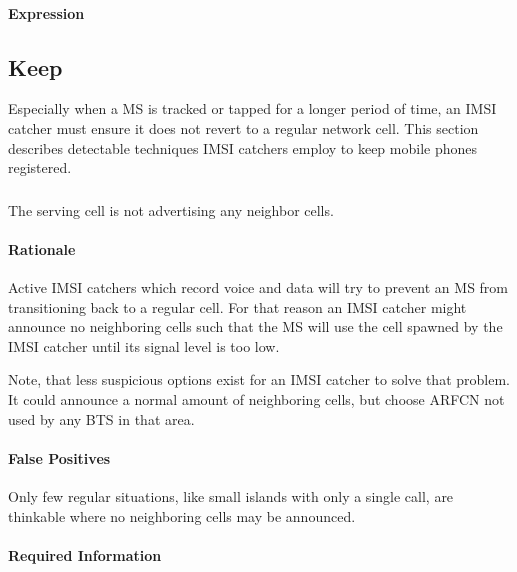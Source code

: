 \documentclass[a4paper,11pt,notitlepage,bigheadings,oneside]{scrartcl}
\begin{document}

\paragraph{Expression}


\subsection{Keep}

Especially when a MS is tracked or tapped for a longer period of time, an IMSI
catcher must ensure it does not revert to a regular network cell. This section
describes detectable techniques IMSI catchers employ to keep mobile phones
registered.

\subsubsection{}

The serving cell is not advertising any neighbor cells.

\paragraph{Rationale}

Active IMSI catchers which record voice and data will try to prevent an MS from
transitioning back to a regular cell. For that reason an IMSI catcher might
announce no neighboring cells such that the MS will use the cell spawned by the
IMSI catcher until its signal level is too low.

Note, that less suspicious options exist for an IMSI catcher to solve that
problem. It could announce a normal amount of neighboring cells, but choose
ARFCN not used by any BTS in that area.

\paragraph{False Positives}

Only few regular situations, like small islands with only a single call, are
thinkable where no neighboring cells may be announced.


\paragraph{Required Information}
\end{document}
